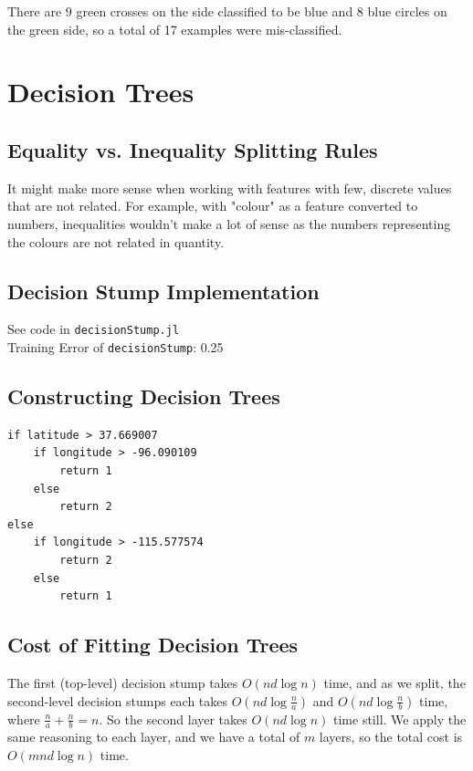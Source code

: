 \documentclass{article}
\begin{document}
There are 9 green crosses on the side classified to be blue and 8 blue circles on the green side, so a total of 17 examples were mis-classified.

\section{Decision Trees}


\subsection{Equality vs. Inequality Splitting Rules}

It might make more sense when working with features with few, discrete values that are not related. For example, with "colour" as a feature converted to numbers, inequalities wouldn't make a lot of sense as the numbers representing the colours are not related in quantity.

\subsection{Decision Stump Implementation}
See code in \texttt{decisionStump.jl}\\
Training Error of \texttt{decisionStump}: 0.25

\subsection{Constructing Decision Trees}
\begin{verbatim}
if latitude > 37.669007
    if longitude > -96.090109
        return 1
    else
        return 2
else
    if longitude > -115.577574
        return 2
    else
        return 1
\end{verbatim}



\subsection{Cost of Fitting Decision Trees}

The first (top-level) decision stump takes $O(nd\log{n})$ time, and as we split, the second-level decision stumps each takes $O(nd\log{\frac{n}{a}})$ and $O(nd\log{\frac{n}{b}})$ time, where $\frac{n}{a} + \frac{n}{b} = n$. So the second layer takes $O(nd\log{n})$ time still. We apply the same reasoning to each layer, and we have a total of $m$ layers, so the total cost is $O(mnd\log{n})$ time.
\end{document}
